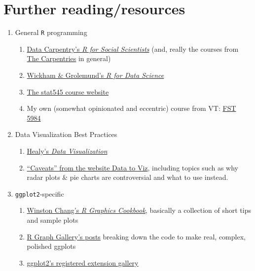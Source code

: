 \documentclass[
]{book}
\providecommand{\tightlist}{%
  \setlength{\itemsep}{0pt}\setlength{\parskip}{0pt}}
\begin{document}
\hypertarget{further-readingresources}{%
\section{Further reading/resources}\label{further-readingresources}}

\begin{enumerate}
\def\labelenumi{\arabic{enumi}.}
\tightlist
\item
  General \texttt{R} programming

  \begin{enumerate}
  \def\labelenumii{\arabic{enumii}.}
  \tightlist
  \item
    \href{https://datacarpentry.org/r-socialsci/}{Data Carpentry's \emph{R for Social Scientists}} (and, really the courses from \href{https://carpentries.org/}{The Carpentries} in general)
  \item
    \href{https://r4ds.had.co.nz/}{Wickham \& Grolemund's \emph{R for Data Science}}
  \item
    \href{https://stat545.com/}{The stat545 course website}
  \item
    My own (somewhat opinionated and eccentric) course from VT: \href{https://jlahne.github.io/food-data-science-2022/}{FST 5984}
  \end{enumerate}
\item
  Data Visualization Best Practices

  \begin{enumerate}
  \def\labelenumii{\arabic{enumii}.}
  \tightlist
  \item
    \href{https://socviz.co/}{Healy's \emph{Data Visualization}}
  \item
    \href{https://www.data-to-viz.com/caveats.html}{``Caveats'' from the website Data to Viz}, including topics such as why radar plots \& pie charts are controversial and what to use instead.
  \end{enumerate}
\item
  \texttt{ggplot2}-specific

  \begin{enumerate}
  \def\labelenumii{\arabic{enumii}.}
  \tightlist
  \item
    \href{https://r-graphics.org/}{Winston Chang's \emph{R Graphics Cookbook}}, basically a collection of short tips and sample plots
  \item
    \href{https://r-graph-gallery.com/index.html}{R Graph Gallery's posts} breaking down the code to make real, complex, polished ggplots
  \item
    \href{https://exts.ggplot2.tidyverse.org/}{ggplot2's registered extension gallery}
  \end{enumerate}
\end{enumerate}
\end{document}
